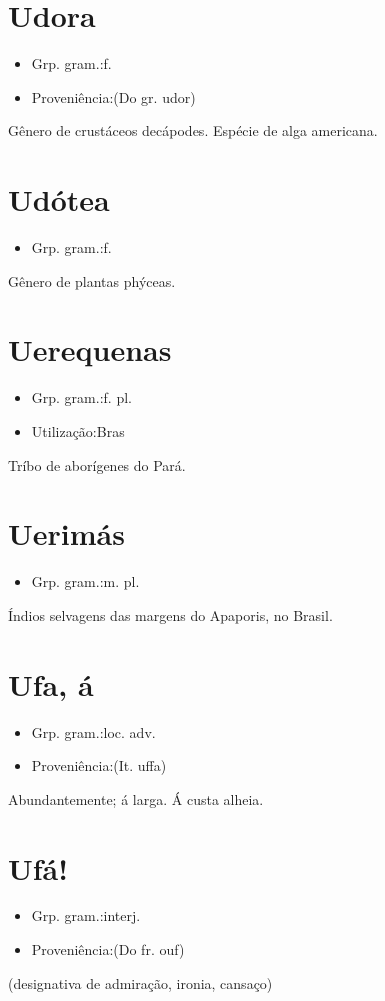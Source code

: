 \documentclass{article}
\begin{document}
\section{Udora}
\begin{itemize}
\item {Grp. gram.:f.}
\end{itemize}
\begin{itemize}
\item {Proveniência:(Do gr. \textunderscore udor\textunderscore )}
\end{itemize}
Gênero de crustáceos decápodes.
Espécie de alga americana.
\section{Udótea}
\begin{itemize}
\item {Grp. gram.:f.}
\end{itemize}
Gênero de plantas phýceas.
\section{Uerequenas}
\begin{itemize}
\item {Grp. gram.:f. pl.}
\end{itemize}
\begin{itemize}
\item {Utilização:Bras}
\end{itemize}
Tríbo de aborígenes do Pará.
\section{Uerimás}
\begin{itemize}
\item {Grp. gram.:m. pl.}
\end{itemize}
Índios selvagens das margens do Apaporis, no Brasil.
\section{Ufa, á}
\begin{itemize}
\item {Grp. gram.:loc. adv.}
\end{itemize}
\begin{itemize}
\item {Proveniência:(It. \textunderscore uffa\textunderscore )}
\end{itemize}
Abundantemente; á larga.
Á custa alheia.
\section{Ufá!}
\begin{itemize}
\item {Grp. gram.:interj.}
\end{itemize}
\begin{itemize}
\item {Proveniência:(Do fr. \textunderscore ouf\textunderscore )}
\end{itemize}
(designativa de \textunderscore admiração\textunderscore , \textunderscore ironia\textunderscore , \textunderscore cansaço\textunderscore )
\end{document}
